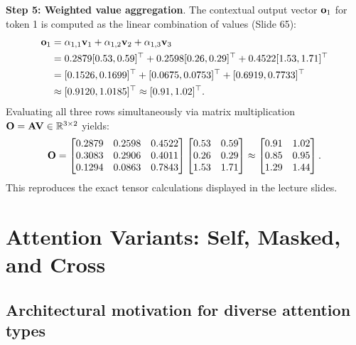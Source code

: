 \documentclass[../../../main.tex]{subfiles}
\begin{document}
\noindent\textbf{Step 5: Weighted value aggregation}.\newline
The contextual output vector $\mathbf{o}_1$ for token 1 is computed as the linear combination of values (Slide 65):
\begin{equation}
\label{eq:vo1_numerical_calc}
\begin{aligned}
\mathbf{o}_1 &= \alpha_{1,1} \mathbf{v}_1 + \alpha_{1,2} \mathbf{v}_2 + \alpha_{1,3} \mathbf{v}_3 \\
&= 0.2879 [0.53, 0.59]^\top + 0.2598 [0.26, 0.29]^\top + 0.4522 [1.53, 1.71]^\top \\
&= [0.1526, 0.1699]^\top + [0.0675, 0.0753]^\top + [0.6919, 0.7733]^\top \\
&\approx [0.9120, 1.0185]^\top \approx [0.91, 1.02]^\top.
\end{aligned}
\end{equation}
Evaluating all three rows simultaneously via matrix multiplication $\mathbf{O} = \mathbf{A} \mathbf{V} \in \mathbb{R}^{3 \times 2}$ yields:
\begin{equation}
\label{eq:matrix_output_numerical_ch5}
\mathbf{O} = \begin{bmatrix}
0.2879 & 0.2598 & 0.4522 \\
0.3083 & 0.2906 & 0.4011 \\
0.1294 & 0.0863 & 0.7843
\end{bmatrix}
\begin{bmatrix}
0.53 & 0.59 \\
0.26 & 0.29 \\
1.53 & 1.71
\end{bmatrix}
\approx \begin{bmatrix}
0.91 & 1.02 \\
0.85 & 0.95 \\
1.29 & 1.44
\end{bmatrix}.
\end{equation}
This reproduces the exact tensor calculations displayed in the lecture slides.

\clearpage
\section{Attention Variants: Self, Masked, and Cross}
\label{sec:attention_types_architectures}

\subsection{Architectural motivation for diverse attention types}
\label{subsec:why_attention_triad}
\end{document}
